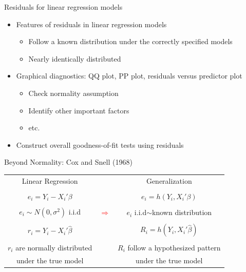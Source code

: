 \documentclass[
  ignorenonframetext,
]{beamer}
\begin{document}
\begin{frame}{Residuals for linear regression models}
\protect\hypertarget{residuals-for-linear-regression-models-1}{}
\begin{itemize}
            \item Features of residuals  in linear regression models 
        \begin{itemize}
            \item Follow a known distribution under the correctly specified models
            \item Nearly identically distributed 
        \end{itemize}
        \vspace{0.1in}
    \item Graphical diagnostics: QQ plot, PP plot, residuals versus predictor plot
    \begin{itemize}
        \item Check normality assumption
        \item Identify other important factors
\item etc.
    \end{itemize}
    \vspace{0.1in}
    \item Construct overall goodness-of-fit tests using residuals

\end{itemize}
\end{frame}

\begin{frame}{Beyond Normality: Cox and Snell (1968)}
\protect\hypertarget{beyond-normality-cox1968general}{}
\begin{table}
\begin{tabular}{ccc}
    Linear Regression & &Generalization\\
\\
    $e_i =Y_i-X_i'\beta$&&$e_i=h(Y_i,X_i'\beta)$\\
    \\
                
                $e_i \sim N(0,\sigma^2)$ i.i.d &{\huge\textcolor{red}{$\Longrightarrow$}}&  $e_i$  i.i.d$\sim$known distribution \\
                \\
        $r_i=Y_i-X_i'\hat{\beta}$&&$R_i=h(Y_i,X_i'\hat{\beta})$\\
        \\
    $r_i$   are normally distributed &&$R_i$ follow a hypothesized pattern \\under the true model&&under the true model
\end{tabular}
\end{table}
\end{frame}
\end{document}
